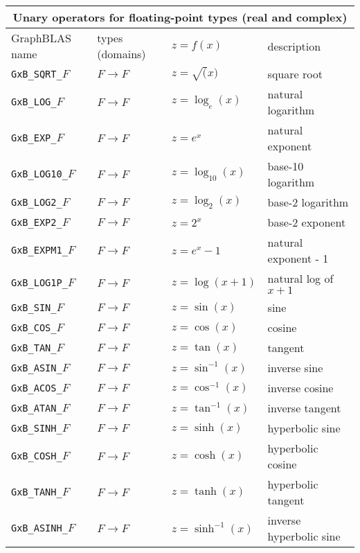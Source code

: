 \documentclass[12pt]{article}
\begin{document}
{\begin{tabular}{|llll|}
\hline
\multicolumn{4}{|c|}{Unary operators for floating-point types (real and complex)} \\
\hline
GraphBLAS name          & types (domains)   & $z=f(x)$      & description \\
\hline
\verb'GxB_SQRT_'$F$     & $F \rightarrow F$ & $z = \sqrt(x)$       & square root \\
\verb'GxB_LOG_'$F$      & $F \rightarrow F$ & $z = \log_e(x)$      & natural logarithm \\
\verb'GxB_EXP_'$F$      & $F \rightarrow F$ & $z = e^x$            & natural exponent \\
\hline
\verb'GxB_LOG10_'$F$    & $F \rightarrow F$ & $z = \log_{10}(x)$   & base-10 logarithm \\
\verb'GxB_LOG2_'$F$     & $F \rightarrow F$ & $z = \log_2(x)$      & base-2 logarithm \\
\verb'GxB_EXP2_'$F$     & $F \rightarrow F$ & $z = 2^x$            & base-2 exponent \\
\hline
\verb'GxB_EXPM1_'$F$    & $F \rightarrow F$ & $z = e^x - 1$        & natural exponent - 1 \\
\verb'GxB_LOG1P_'$F$    & $F \rightarrow F$ & $z = \log(x+1)$      & natural log of $x+1$ \\
\hline
\verb'GxB_SIN_'$F$      & $F \rightarrow F$ & $z = \sin(x)$        & sine \\
\verb'GxB_COS_'$F$      & $F \rightarrow F$ & $z = \cos(x)$        & cosine \\
\verb'GxB_TAN_'$F$      & $F \rightarrow F$ & $z = \tan(x)$        & tangent \\
\hline
\verb'GxB_ASIN_'$F$     & $F \rightarrow F$ & $z = \sin^{-1}(x)$        & inverse sine \\
\verb'GxB_ACOS_'$F$     & $F \rightarrow F$ & $z = \cos^{-1}(x)$        & inverse cosine \\
\verb'GxB_ATAN_'$F$     & $F \rightarrow F$ & $z = \tan^{-1}(x)$        & inverse tangent \\
\hline
\verb'GxB_SINH_'$F$     & $F \rightarrow F$ & $z = \sinh(x)$        & hyperbolic sine \\
\verb'GxB_COSH_'$F$     & $F \rightarrow F$ & $z = \cosh(x)$        & hyperbolic cosine \\
\verb'GxB_TANH_'$F$     & $F \rightarrow F$ & $z = \tanh(x)$        & hyperbolic tangent \\
\hline
\verb'GxB_ASINH_'$F$    & $F \rightarrow F$ & $z = \sinh^{-1}(x)$        & inverse hyperbolic sine \\

\end{tabular}}
\end{document}
